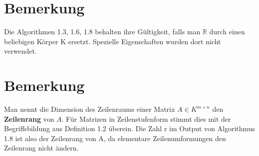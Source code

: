 \documentclass{scrbook}
\begin{document}
\section{Bemerkung}
Die Algorithmen 1.3, 1.6, 1.8 behalten ihre Gültigkeit, falls man $\mathbb{R}$ durch einen beliebigen Körper K ersetzt. Spezielle Eigenschaften wurden dort nicht verwendet.
\section{Bemerkung}
Man nennt die Dimension des Zeilenraums einer Matrix $A\in K^{m\times n}$ den \textbf{Zeilenrang} von $A$. Für Matrizen in Zeilenstufenform stimmt dies mit der Begriffsbildung aus Definition 1.2 überein. Die Zahl r im Output von Algorithmus 1.8 ist also der Zeilenrang von A, da elementare Zeilenumformungen den Zeilenrang nicht ändern.
\end{document}
